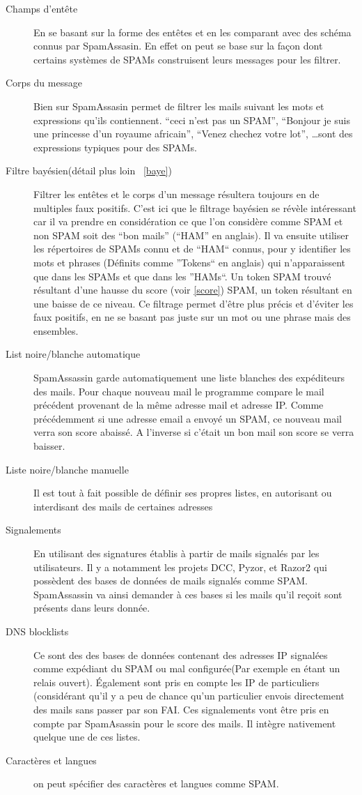 \documentclass[a4paper,11pt]{article}
\begin{document}
\begin{description}
 \item [Champs d'entête] En se basant sur la forme des entêtes et en les comparant avec des schéma connus par SpamAssasin. En effet 
 on peut se base sur la façon dont certains systèmes de SPAMs construisent leurs messages pour les filtrer. 
 \item [Corps du message] Bien sur SpamAssasin permet de filtrer les mails suivant les mots et expressions qu'ils contiennent. 
 ``ceci n'est pas un SPAM'', ``Bonjour je suis une princesse d'un royaume africain'', ``Venez chechez votre lot'', \dots sont des expressions
 typiques pour des SPAMs. 
 \item [Filtre bayésien(détail plus loin ~\ref{baye})] Filtrer les entêtes et le corps d'un message résultera toujours en de multiples faux positifs. C'est ici que le filtrage 
 bayésien se révèle intéressant car il va prendre en considération ce que l'on considère comme SPAM et non SPAM soit des ``bon mails'' (``HAM'' en anglais).
 Il va ensuite utiliser les répertoires de SPAMs connu et de ``HAM``  connus, pour y identifier les mots et phrases (Définits comme ''Tokens`` en anglais)
 qui n'apparaissent que dans les SPAMs et que dans les ''HAMs``.
 Un token SPAM trouvé résultant d'une hausse du score (voir \ref{score}) SPAM, un token résultant en une baisse de ce niveau. Ce filtrage permet d'être plus précis et d'éviter les faux positifs, 
 en ne se basant pas juste sur un mot ou une phrase mais des ensembles. 
 \item [List noire/blanche automatique] SpamAssassin garde automatiquement une liste blanches des expéditeurs des mails.
 Pour chaque nouveau mail le programme compare le mail précédent provenant de la même adresse mail et adresse IP.
 Comme précédemment si une adresse email a envoyé un SPAM, ce nouveau mail verra son score abaissé. A l'inverse si c'était un bon mail son score 
 se verra baisser.
 \item [Liste noire/blanche manuelle] Il est tout à fait possible de définir ses propres listes, en autorisant ou 
 interdisant des mails de certaines adresses
 \item [Signalements] En utilisant des signatures établis à partir de mails signalés par les utilisateurs. Il y a notamment les projets DCC, Pyzor, et Razor2
 qui possèdent des bases de données de mails signalés comme SPAM. SpamAssassin va ainsi demander à ces bases si les mails qu'il reçoit 
 sont présents dans leurs donnée.
 \item [DNS blocklists] Ce sont des des bases de données contenant des adresses IP signalées comme expédiant du SPAM ou mal 
 configurée(Par exemple en étant un relais ouvert). Également sont pris en compte les IP de particuliers (considérant qu'il y a peu de chance
qu'un particulier envois directement des mails sans passer par son FAI. Ces signalements vont être pris en compte par SpamAsassin pour le score des mails.
Il intègre nativement quelque une de ces listes.
\item [Caractères et langues] on peut spécifier des caractères et langues comme SPAM.


\end{description}
\end{document}
